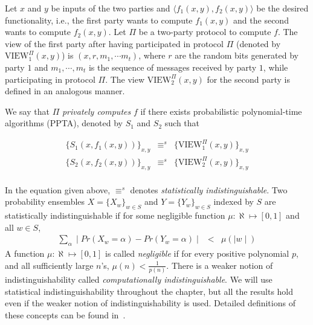 \begin{definition}
\label{def:privacy}
\rm
Let $x$ and $y$ be inputs of the two parties and $\langle f_1 (x,y),
f_2 (x,y) \rangle$ be the desired functionality, i.e., the first party
wants to compute $f_1 (x,y)$ and the second wants to compute $f_2
(x,y)$. Let $\Pi$ be a two-party protocol to compute $f$. The view
of the first party after having participated in protocol $\Pi$ 
(denoted by $\mbox{VIEW}_1^\Pi (x,y)$) is $(x,r,m_1, \cdots m_t)$, where
$r$ are the random bits generated by party $1$ and $m_1, \cdots, m_t$ is the
sequence of messages received by party $1$, while participating in protocol
$\Pi$. The view $\mbox{VIEW}_2^\Pi (x,y)$ for the second party  is defined
in an analogous manner.

We say that $\Pi$ {\em privately computes} $f$ if there exists 
probabilistic polynomial-time algorithms (PPTA), denoted by $S_1$ and $S_2$
such that

\begin{eqnarray*}
\{ S_1 (x,f_1 (x,y)) \}_{x,y} & \equiv^s & \{ \mbox{VIEW}_1^\Pi (x,y) \}_{x,y} \\
\{ S_2 (x,f_2 (x,y)) \}_{x,y} & \equiv^s & \{ \mbox{VIEW}_2^\Pi (x,y) \}_{x,y} \\
\end{eqnarray*}

In the equation given above, $\equiv^s$ denotes {\em statistically
indistinguishable}.  Two probability ensembles $X = \{ X_w \}_{w \in
S}$ and $Y = \{ Y_w \}_{w \in S}$ indexed by $S$ are statistically
indistinguishable if for some negligible function $\mu : \aleph \mapsto
[0,1]$ and all $w \in S$,
\begin{eqnarray*}
\sum_{\alpha} \mid Pr ( X_w = \alpha ) - Pr ( Y_w = \alpha ) \mid & < & \mu ( \mid w \mid )
\end{eqnarray*}
A function $\mu : \aleph \mapsto [0,1]$ is called {\it negligible}
if for every positive polynomial $p$, and all sufficiently large $n$'s,
$\mu (n) < \frac{1}{p(n)}$. There is a weaker notion of indistinguishability
called {\em computationally indistinguishable}. We will use statistical
indistinguishability throughout the chapter, but all the results hold even if
the weaker notion of indistinguishability is used. Detailed definitions of
these concepts can be found in~\cite{GoldreichBookVol1,Goldreich:vol2}. 

\end{definition}

